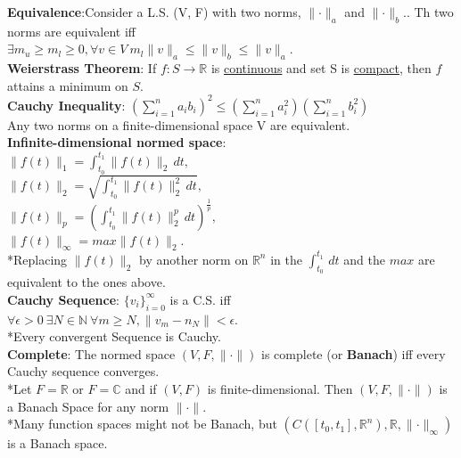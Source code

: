 \documentclass[10pt,landscape]{article}
\begin{document}
\begin{multicols*}{4}
\textbf{Equivalence}:Consider a L.S. (V, F) with two norms, $\parallel \cdot \parallel_a$ and $\parallel \cdot \parallel_b$.. Th two norms are equivalent iff\\
$\exists m_u \geq m_l \geq 0, \forall v \in V\ m_l\parallel v \parallel_a \leq \parallel v \parallel_b \leq \parallel v \parallel_a$.\\ 

\textbf{Weierstrass Theorem}: If $f: S \rightarrow \mathbb{R}$ is \underline{continuous} and set S is \underline{compact}, then $f$ attains a minimum on $S$.\\

\textbf{Cauchy Inequality}: $ (\sum_{i=1}^{n} a_i b_i)^{2} \leq (\sum_{i=1}^{n} a_i^2)(\sum_{i=1}^{n} b_i^2) $\\
Any two norms on a finite-dimensional space V are equivalent.\\

\textbf{Infinite-dimensional normed space}: \\
$\parallel f(t) \parallel_1 = \int_{t_0}^{t_1} \parallel f(t) \parallel_2 \,dt,$\\
$\parallel f(t) \parallel_2 = \sqrt{\int_{t_0}^{t_1} \parallel f(t) \parallel_2 ^2 \,dt},$\\
$\parallel f(t) \parallel_p = (\int_{t_0}^{t_1} \parallel f(t) \parallel_2 ^p \,dt)^{\frac{1}{p}},$\\
$\parallel f(t) \parallel_\infty = max \parallel f(t) \parallel_2.$\\
*Replacing $\parallel f(t) \parallel_2$ by another norm on $\mathbb{R}^n$ in the $\int_{t_0}^{t_1} \,dt$ and the $max$ are equivalent to the ones above.\\

\textbf{Cauchy Sequence}: $\{v_i\}_{i=0} ^\infty$ is a C.S. iff\\
$\forall \epsilon >0\ \exists N \in \mathbb{N}\ \forall m \geq N, \parallel v_m-n_N \parallel < \epsilon$.\\
*Every convergent Sequence is Cauchy.\\

\textbf{Complete}: The normed space $(V, F, \parallel \cdot \parallel)$ is complete (or \textbf{Banach}) iff every Cauchy sequence converges.\\
*Let $F = \mathbb{R}$ or $F = \mathbb{C}$ and if $(V,F)$ is finite-dimensional. Then $(V,F,\parallel \cdot \parallel)$ is a Banach Space for any norm $\parallel \cdot \parallel.$\\
*Many function spaces might not be Banach, but $(C([t_0,t_1], \mathbb{R}^n), \mathbb{R}, \parallel \cdot \parallel_\infty)$ is a Banach space.


\end{multicols*}
\end{document}
